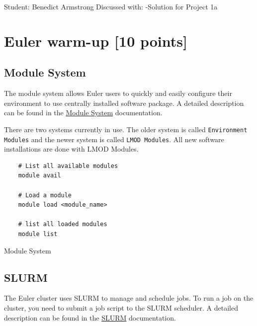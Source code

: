 \documentclass[unicode,11pt,a4paper,oneside,numbers=endperiod,openany]{scrartcl}
\begin{document}
\setassignment
{}

{Student: Benedict Armstrong}
{Discussed with: -}{Solution for Project 1a}{}
\newline




\section{Euler warm-up [10 points]}

\subsection{Module System}

The module system allows Euler users to quickly and easily configure their environment to use centrally installed software package. A detailed description can be found in the \href{https://scicomp.ethz.ch/wiki/Modules_and_applications}{Module System} documentation.

There are two systems currently in use. The older system is called \texttt{Environment Modules} and the newer system is called \texttt{LMOD Modules}. All new software installations are done with LMOD Modules.

\begin{listing}[!ht]
    \begin{verbatim}
    # List all available modules
    module avail
    
    # Load a module
    module load <module_name>
    
    # list all loaded modules
    module list
    \end{verbatim}
    \caption{Module System}
    \label{lst:module_system}
\end{listing}

\subsection{SLURM}

The Euler cluster uses SLURM to manage and schedule jobs. To run a job on the cluster, you need to submit a job script to the SLURM scheduler. A detailed description can be found in the \href{https://scicomp.ethz.ch/wiki/Job_management_with_SLURM}{SLURM} documentation.
\end{document}
